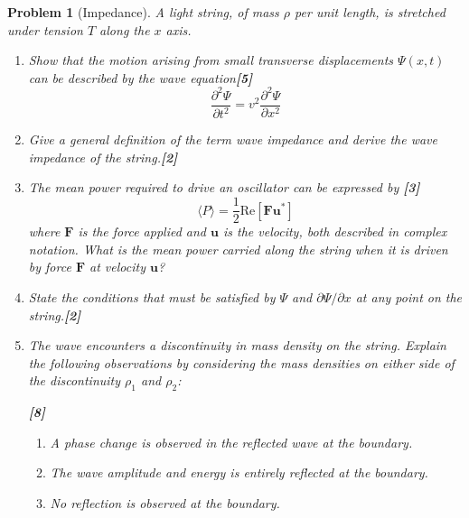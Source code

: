 \documentclass[a4paper]{article}
\theoremstyle{new}
\newtheorem{qns}{Problem}[subsection]
\begin{document}
\newpage
\begin{qns}[Impedance]
A light string, of mass $\rho$ per unit length, is stretched under tension $T$ along the $x$ axis.
\begin{enumerate}[label=(\alph*)]
\item Show that the motion arising from small transverse displacements $\Psi(x,t)$ can be described by the wave equation\hfill\textbf{[5]}
$$\frac{\partial^2\Psi}{\partial t^2}=v^2\frac{\partial^2\Psi}{\partial x^2}$$
\item Give a general definition of the term wave impedance and derive the wave impedance of the string.\hfill\textbf{[2]}
\item The mean power required to drive an oscillator can be expressed by \hfill\textbf{[3]}
$$\langle P\rangle=\frac{1}{2}\text{Re}[\mathbf{F}\mathbf{u^*}]$$
where $\mathbf{F}$ is the force applied and $\mathbf{u}$ is the velocity, both described in complex notation. What is the mean power carried along the string when it is driven by force $\mathbf{F}$ at velocity $\mathbf{u}$?
\item State the conditions that must be satisfied by $\Psi$ and $\partial\Psi/\partial x$ at any point on the string.\hfill\textbf{[2]}
\item The wave encounters a discontinuity in mass density on the string. Explain the following observations by considering the mass densities on either side of the discontinuity $\rho_1$ and $\rho_2$:

\hfill\textbf{[8]}
\begin{enumerate}[label=(\roman*)]
    \item A phase change is observed in the reflected wave at the boundary.
    \item The wave amplitude and energy is entirely reflected at the boundary.
    \item No reflection is observed at the boundary.
\end{enumerate}
\end{enumerate}
\end{qns}
\end{document}
